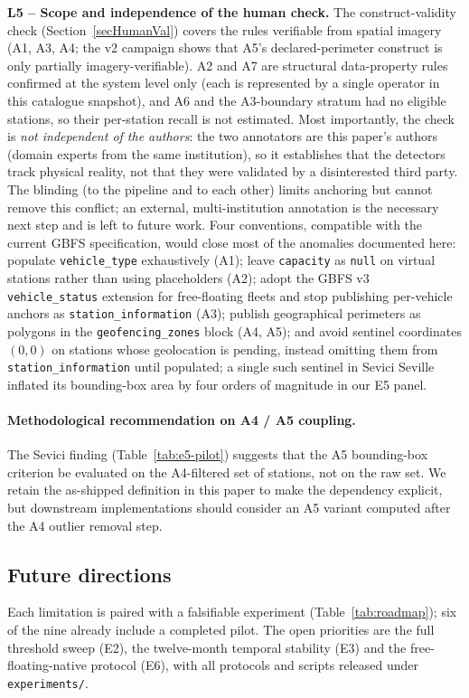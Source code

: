 \documentclass[11pt,a4paper]{article}
\begin{document}
\textbf{L5 -- Scope and independence of the human check.} The
construct-validity check (Section~\ref{secHumanVal}) covers the rules
verifiable from spatial imagery (A1, A3, A4; the v2 campaign shows that
A5's declared-perimeter construct is only partially imagery-verifiable). A2 and A7 are structural
data-property rules confirmed at the system level only (each is represented
by a single operator in this catalogue snapshot), and A6 and the A3-boundary
stratum had no eligible stations, so their per-station recall is not
estimated. Most importantly, the check is \emph{not independent of the
authors}: the two annotators are this paper's authors (domain experts from
the same institution), so it establishes that the detectors track physical
reality, not that they were validated by a disinterested third party. The
blinding (to the pipeline and to each other) limits anchoring but cannot
remove this conflict; an external, multi-institution annotation is the
necessary next step and is left to future work.
Four conventions, compatible with the current GBFS specification,
would close most of the anomalies documented here: populate
\texttt{vehicle\_type} exhaustively (A1); leave \texttt{capacity}
as \texttt{null} on virtual stations rather than using placeholders
(A2); adopt the GBFS v3 \texttt{vehicle\_status} extension for
free-floating fleets and stop publishing per-vehicle anchors as
\texttt{station\_information} (A3); publish geographical perimeters
as polygons in the \texttt{geofencing\_zones} block (A4, A5); and
avoid sentinel coordinates $(0,0)$ on stations whose geolocation is
pending, instead omitting them from \texttt{station\_information}
until populated; a single such sentinel in Sevici Seville
inflated its bounding-box area by four orders of magnitude in our
E5 panel.

\paragraph{Methodological recommendation on A4 / A5 coupling.}
The Sevici finding (Table~\ref{tab:e5-pilot}) suggests that the A5
bounding-box criterion be evaluated on the A4-filtered set of
stations, not on the raw set. We retain the as-shipped definition
in this paper to make the dependency explicit, but downstream
implementations should consider an A5 variant computed after the
A4 outlier removal step.

\subsection{Future directions}
Each limitation is paired with a falsifiable experiment
(Table~\ref{tab:roadmap}); six of the nine already include a completed
pilot. The open priorities are the full threshold sweep (E2), the
twelve-month temporal stability (E3) and the free-floating-native protocol
(E6), with all protocols and scripts released under \texttt{experiments/}.
\end{document}
